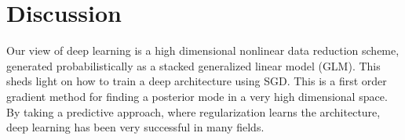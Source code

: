 \documentclass[12pt]{article}
\begin{document}
%
%
%
%
%
%


\section{Discussion}
Our view of deep learning is a high dimensional nonlinear data reduction scheme, generated probabilistically  as a stacked generalized linear model (GLM). This sheds light on how to  train a deep architecture using SGD. This is a first order gradient method for finding a posterior  mode in a very high dimensional space. By taking a predictive approach, where regularization learns the architecture, deep learning has been very successful in many fields.  
\end{document}
